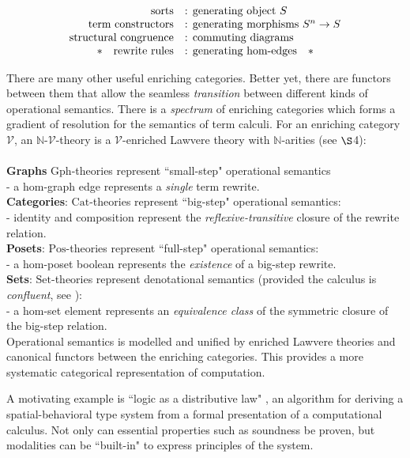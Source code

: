 \documentclass[a4paper,UKenglish]{article}
\theoremstyle{definition}
\newcommand{\Gph}{\mathrm{Gph}}
\newcommand{\Set}{\mathrm{Set}}
\newcommand{\Cat}{\mathrm{Cat}}
\newcommand{\Pos}{\mathrm{Pos}}
\newcommand{\NN}{\mathbb{N}}
\newcommand{\V}{\mathscr{V}}
\begin{document}
\[\begin{array}{rl}
\text{sorts} & \text{: generating object } S\\
\text{term constructors} & \text{: generating morphisms } S^n \to S\\
\text{structural congruence} & \text{: commuting diagrams}\\
\text{\textasteriskcentered \quad rewrite rules} & \text{: generating hom-edges\quad\textasteriskcentered}\\
\end{array}\]

There are many other useful enriching categories. Better yet, there are functors between them that allow the seamless \textit{transition} between different kinds of operational semantics. There is a \textit{spectrum} of enriching categories which forms a gradient of resolution for the semantics of term calculi. For an enriching category $\V$, an $\NN$-$\V$-theory is a $\V$-enriched Lawvere theory with $\NN$-arities (see $\S$4):\\\\
\textbf{Graphs} $\Gph$-theories represent ``small-step" operational semantics\\ - a hom-graph edge represents a \textit{single} term rewrite.\\
\textbf{Categories}: $\Cat$-theories represent ``big-step" operational semantics:\\ - identity and composition represent the \textit{reflexive-transitive} closure of the rewrite relation.\\
\textbf{Posets}: $\Pos$-theories represent ``full-step" operational semantics:\\ - a hom-poset boolean represents the \textit{existence} of a big-step rewrite.\\
\textbf{Sets}: $\Set$-theories represent denotational semantics (provided the calculus is \textit{confluent}, see \cite{lam}):\\ - a hom-set element represents an \textit{equivalence class} of the symmetric closure of the big-step relation.\\

Operational semantics is modelled and unified by enriched Lawvere theories and canonical functors between the enriching categories. This provides a more systematic categorical representation of computation.

A motivating example is ``logic as a distributive law" \cite{ladl}, an algorithm for deriving a spatial-behavioral type system from a formal presentation of a computational calculus. Not only can essential properties such as soundness be proven, but modalities can be ``built-in" to express principles of the system.
\end{document}
